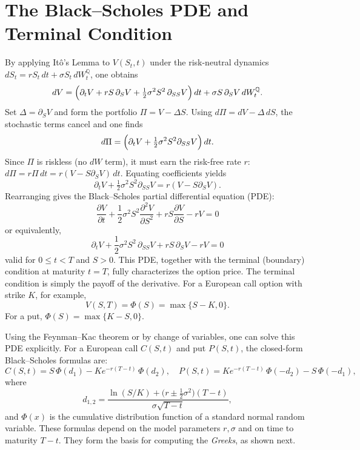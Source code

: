 \section{The Black--Scholes PDE and Terminal Condition}
By applying Itô's Lemma to \(V(S_t,t)\) under the risk-neutral dynamics \(dS_t = rS_t\,dt + \sigma S_t\,dW_t^\mathbb{Q}\), one obtains
\[
dV = \Bigl(\partial_t V + rS \,\partial_S V + \tfrac12\sigma^2 S^2 \,\partial_{SS}V\Bigr)\,dt + \sigma S\,\partial_S V\,dW_t^\mathbb{Q}.
\]
Set \(\Delta = \partial_S V\) and form the portfolio \(\Pi = V - \Delta S\).  Using \(d\Pi = dV - \Delta\,dS\), the stochastic terms cancel and one finds
\[
d\Pi = \Bigl(\partial_t V + \tfrac12\sigma^2 S^2 \partial_{SS}V\Bigr)\,dt.
\]
Since \(\Pi\) is riskless (no \(dW\) term), it must earn the risk-free rate \(r\): \(d\Pi = r\Pi\,dt = r(V - S\partial_S V)\,dt\).  Equating coefficients yields
\[
\partial_t V + \tfrac12\sigma^2 S^2 \partial_{SS}V = r(V - S\partial_S V).
\]
Rearranging gives the Black--Scholes partial differential equation (PDE):
\[
\frac{\partial V}{\partial t}
+ \frac{1}{2} \sigma^2 S^2 \frac{\partial^2 V}{\partial S^2}
+ r S \frac{\partial V}{\partial S}
- r V = 0
\]
or equivalently,
\[
\partial_t V
+ \frac{1}{2} \sigma^2 S^2 \, \partial_{SS} V
+ r S \, \partial_S V
- r V = 0
\]
valid for \(0\le t< T\) and \(S>0\).  This PDE, together with the terminal (boundary) condition at maturity \(t=T\), fully characterizes the option price.  The terminal condition is simply the payoff of the derivative.  For a European call option with strike \(K\), for example,
\[
V(S,T) = \Phi(S) = \max\{S-K,0\}.
\]
For a put, \(\Phi(S)=\max\{K-S,0\}\). 

Using the Feynman–Kac theorem or by change of variables, one can solve this PDE explicitly.  For a European call \(C(S,t)\) and put \(P(S,t)\), the closed-form Black–Scholes formulas are:
\[
C(S,t) = S\,\Phi(d_1) - K e^{-r (T-t)} \,\Phi(d_2), 
\quad
P(S,t) = K e^{-r (T-t)} \,\Phi(-d_2) - S\,\Phi(-d_1),
\]
where 
\[
d_{1,2} = \frac{\ln(S/K) + \bigl(r \pm \tfrac12\sigma^2\bigr)(T-t)}{\sigma \sqrt{T-t}},
\]
and \(\Phi(x)\) is the cumulative distribution function of a standard normal random variable.  These formulas depend on the model parameters \(r,\sigma\) and on time to maturity \(T-t\).  They form the basis for computing the \emph{Greeks}, as shown next.

